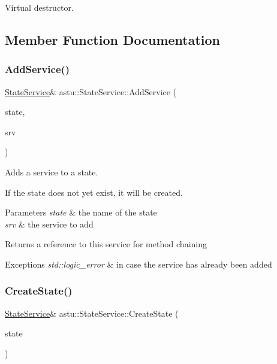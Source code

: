 Virtual destructor. 

\subsection{Member Function Documentation}
\mbox{\label{classastu_1_1StateService_aed603f7dca136364b7a6ff815ccb44e0}} 
\subsubsection{\texorpdfstring{Add\+Service()}{AddService()}}
{\footnotesize\ttfamily \hyperlink{classastu_1_1StateService}{State\+Service}\& astu\+::\+State\+Service\+::\+Add\+Service (\begin{DoxyParamCaption}\item[{const std\+::string \&}]{state,  }\item[{std\+::shared\+\_\+ptr$<$ \hyperlink{classastu_1_1Service}{Service} $>$}]{srv }\end{DoxyParamCaption})}

Adds a service to a state.

If the state does not yet exist, it will be created.


\begin{DoxyParams}{Parameters}
{\em state} & the name of the state \\
\hline
{\em srv} & the service to add \\
\hline
\end{DoxyParams}
\begin{DoxyReturn}{Returns}
a reference to this service for method chaining 
\end{DoxyReturn}

\begin{DoxyExceptions}{Exceptions}
{\em std\+::logic\+\_\+error} & in case the service has already been added \\
\hline
\end{DoxyExceptions}
\mbox{\label{classastu_1_1StateService_a62ddc47e0c0ed7232e672c995a978a71}} 
\subsubsection{\texorpdfstring{Create\+State()}{CreateState()}}
{\footnotesize\ttfamily \hyperlink{classastu_1_1StateService}{State\+Service}\& astu\+::\+State\+Service\+::\+Create\+State (\begin{DoxyParamCaption}\item[{const std\+::string \&}]{state }\end{DoxyParamCaption})}

